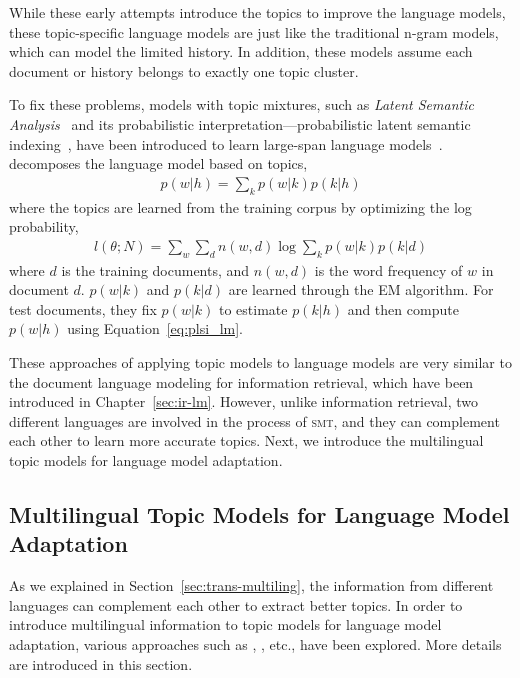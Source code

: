 While these early attempts introduce the topics to improve the
language models, these topic-specific language models are just like
the traditional n-gram models, which can model the limited
history. In addition, these models assume each document or history belongs
to exactly one topic cluster.

To fix these problems, models with topic mixtures, such as
\emph{Latent Semantic Analysis}~\citep[\textsc{lsa}]{deerwester-90}
and its probabilistic interpretation---probabilistic latent semantic
indexing~\citep[\textsc{plsi}]{hofmann-99}, have been introduced to
learn large-span language
models~\citep{Bellegarda-1997,Coccaro-1998,Gildea-1999}. \citet{Gildea-1999}
decomposes the language model based on topics,
\begin{align}
\label{eq:plsi_lm}
p(w|h) = \sum_k p(w|k) p(k|h)
\end{align}
where the topics are learned from the training corpus by optimizing the log probability,
\begin{align}
l(\theta; N) = \sum_w \sum_d n(w,d) \log \sum_k p(w|k) p(k|d)
\end{align}
where $d$ is the training documents, and $n(w,d)$ is the word frequency of $w$ in document $d$. $p(w|k)$ and $p(k|d)$ are learned through the EM algorithm. For test documents, they fix $p(w|k)$ to estimate $p(k|h)$ and then compute $p(w|h)$ using Equation~\ref{eq:plsi_lm}. 

These approaches of applying topic models to language models are very
similar to the document language modeling for information retrieval,
which have been introduced in Chapter~\ref{sec:ir-lm}. However, unlike
information retrieval, two different languages are involved in the
process of \textsc{smt}, and they can complement each other to learn
more accurate topics. Next, we introduce the multilingual topic models
for language model adaptation.

\subsection{Multilingual Topic Models for Language Model Adaptation}

As we explained in Section~\ref{sec:trans-multiling}, the information
from different languages can complement each other to extract better
topics. In order to introduce multilingual information to topic models
for language model adaptation, various approaches such as
\cite{Tam-2007}, \cite{Ruiz-2011}, \cite{Yu-2013} etc., have been
explored. More details are introduced in this section.


